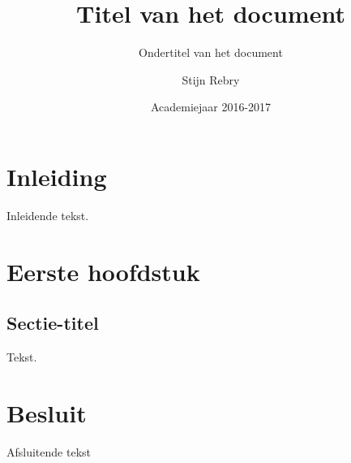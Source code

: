 \documentclass[a4paper,twoside,kulak]{kulakreport}
\title{Titel van het document}
\subtitle{Ondertitel van het document}
\author{Stijn Rebry}
\institute{KU Leuven Kulak, Wetenschap \& Technologie}
\date{Academiejaar 2016-2017}
\begin{document}

\titlepage

\tableofcontents

\chapter*{Inleiding}
Inleidende tekst.

\chapter{Eerste hoofdstuk}
\section{Sectie-titel}
Tekst.

\chapter*{Besluit}
Afsluitende tekst
\end{document}
